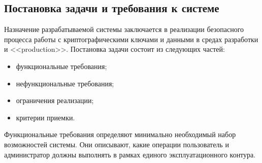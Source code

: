 \documentclass[14pt, a4paper]{extarticle}
\begin{document}
	\subsection{Постановка задачи и требования к системе}
	
	Назначение разрабатываемой системы заключается в реализации безопасного процесса работы с криптографическими ключами и данными в средах разработки и <<production>>. Постановка задачи состоит из следующих частей:
	
	\begin{itemize}
		\item функциональные требования;
		\item нефункциональные требования;
		\item ограничения реализации;
		\item критерии приемки.
	\end{itemize}
	
	Функциональные требования определяют минимально необходимый набор возможностей системы. Они описывают, какие операции пользователь и администратор должны выполнять в рамках единого эксплуатационного контура.
	
\end{document}
